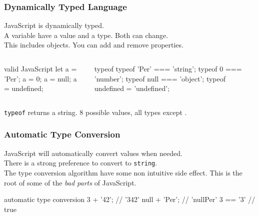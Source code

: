 \begin{frame}[fragile]
  \frametitle{Dynamically Typed Language}
  JavaScript is dynamically typed.\\
  A variable have a value and a type. Both can change.\\
  This includes objects. You can add and remove properties.\\
  \vspace{5mm}
  \begin{columns}[onlytextwidth]
    \begin{column}{0.4\textwidth}
      \begin{CodeBox}{ valid JavaScript}
let a = 'Per';  
a = 0;
a = null;
a = undefined;
      \end{CodeBox}
    \end{column}
  \begin{column}{0.55\textwidth}
    \begin{CodeBox}{typeof}
typeof 'Per' === 'string';
typeof 0 === 'number';
typeof null === 'object';
typeof undefined = 'undefined';
      \end{CodeBox}
    \end{column}
    \begin{column}{0.3\textwidth}  \end{column}
  \end{columns}%
  \vspace{5mm}
\verb|typeof| returns a string. 8 possible values, all types except .
\end{frame}

\begin{frame}[fragile]
  \frametitle{Automatic Type Conversion}
  JavaScript will automatically convert values when needed.\\
  There is a strong preference to convert to \verb|string|.\\
  The type conversion algorithm have some non intuitive side effect. This is the root of some of the \emph{bad parts}
   of JavaScript.
\vspace{5mm}
  \begin{CodeBox}{ automatic type conversion}
3 + '42';      // '342'
null + 'Per'; //  'nullPer'
3 == '3'       // true
  \end{CodeBox}
\end{frame}

